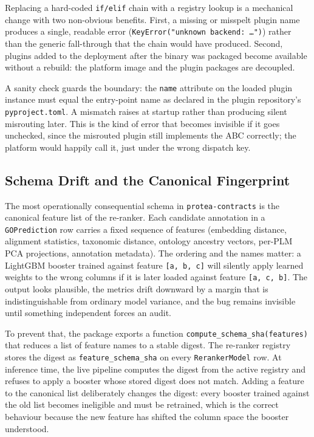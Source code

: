 Replacing a hard-coded \texttt{if/elif} chain with a registry lookup is a
mechanical change with two non-obvious benefits. First, a missing or
misspelt plugin name produces a single, readable error
(\texttt{KeyError("unknown backend: \ldots")}) rather than the generic
fall-through that the chain would have produced. Second, plugins added to
the deployment after the binary was packaged become available without a
rebuild: the platform image and the plugin packages are decoupled.

A sanity check guards the boundary: the \texttt{name} attribute on the
loaded plugin instance must equal the entry-point name as declared in the
plugin repository's \texttt{pyproject.toml}. A mismatch raises at startup
rather than producing silent misrouting later. This is the kind of error
that becomes invisible if it goes unchecked, since the misrouted plugin
still implements the ABC correctly; the platform would happily call it,
just under the wrong dispatch key.

\subsection{Schema Drift and the Canonical Fingerprint}
\label{subsec:schema-sha}

The most operationally consequential schema in \texttt{protea-contracts}
is the canonical feature list of the re-ranker. Each candidate annotation
in a \texttt{GOPrediction} row carries a fixed sequence of features
(embedding distance, alignment statistics, taxonomic distance, ontology
ancestry vectors, per-PLM PCA projections, annotation metadata). The
ordering and the names matter: a LightGBM booster trained against feature
\texttt{[a, b, c]} will silently apply learned weights to the wrong
columns if it is later loaded against feature \texttt{[a, c, b]}. The
output looks plausible, the metrics drift downward by a margin that is
indistinguishable from ordinary model variance, and the bug remains
invisible until something independent forces an audit.

To prevent that, the package exports a function
\texttt{compute\_schema\_sha(features)} that reduces a list of feature
names to a stable digest. The re-ranker registry stores the digest as
\texttt{feature\_schema\_sha} on every \texttt{RerankerModel} row. At
inference time, the live pipeline computes the digest from the active
registry and refuses to apply a booster whose stored digest does not
match. Adding a feature to the canonical list deliberately changes the
digest: every booster trained against the old list becomes ineligible and
must be retrained, which is the correct behaviour because the new feature
has shifted the column space the booster understood.

